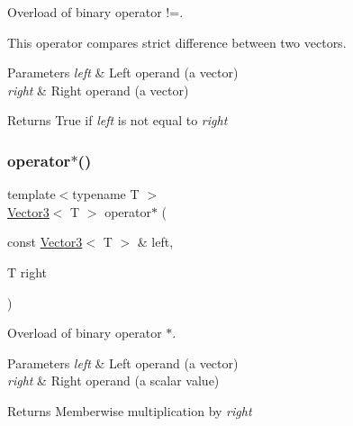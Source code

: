 Overload of binary operator !=. 

This operator compares strict difference between two vectors.


\begin{DoxyParams}{Parameters}
{\em left} & Left operand (a vector) \\
\hline
{\em right} & Right operand (a vector)\\
\hline
\end{DoxyParams}
\begin{DoxyReturn}{Returns}
True if {\itshape left} is not equal to {\itshape right} \begin{DoxyVerb}\end{DoxyVerb}
 
\end{DoxyReturn}
\mbox{\label{classsf_1_1_vector3_a44ec312b31c1a85dcff4863795f98329}} 
\subsubsection{\texorpdfstring{operator$\ast$()}{operator*()}\hspace{0.1cm}{\footnotesize\ttfamily [1/2]}}
{\footnotesize\ttfamily template$<$typename T $>$ \\
\mbox{\hyperlink{classsf_1_1_vector3}{Vector3}}$<$ T $>$ operator$\ast$ (\begin{DoxyParamCaption}\item[{const \mbox{\hyperlink{classsf_1_1_vector3}{Vector3}}$<$ T $>$ \&}]{left,  }\item[{T}]{right }\end{DoxyParamCaption})\hspace{0.3cm}{\ttfamily [related]}}



Overload of binary operator $\ast$. 


\begin{DoxyParams}{Parameters}
{\em left} & Left operand (a vector) \\
\hline
{\em right} & Right operand (a scalar value)\\
\hline
\end{DoxyParams}
\begin{DoxyReturn}{Returns}
Memberwise multiplication by {\itshape right} \begin{DoxyVerb}\end{DoxyVerb}
 
\end{DoxyReturn}
\mbox{\label{classsf_1_1_vector3_aa6f2b0d9f79c1b9774759b7087affbb1}} 
